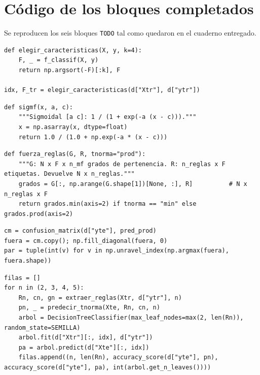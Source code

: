 \documentclass[11pt,letterpaper]{article}
\begin{document}
\clearpage
\appendix
\section{Código de los bloques completados}
\label{anexo:codigo}

Se reproducen los seis bloques \texttt{TODO} tal como quedaron en el cuaderno entregado.

\begin{lstlisting}[caption={TODO 1, cuatro características con el entrenamiento}]
def elegir_caracteristicas(X, y, k=4):
    F, _ = f_classif(X, y)
    return np.argsort(-F)[:k], F

idx, F_tr = elegir_caracteristicas(d["Xtr"], d["ytr"])
\end{lstlisting}

\begin{lstlisting}[caption={TODO 2, función sigmoidal}]
def sigmf(x, a, c):
    """Sigmoidal [a c]: 1 / (1 + exp(-a (x - c)))."""
    x = np.asarray(x, dtype=float)
    return 1.0 / (1.0 + np.exp(-a * (x - c)))
\end{lstlisting}

\begin{lstlisting}[caption={TODO 3, fuerza de las reglas con mínimo o producto}]
def fuerza_reglas(G, R, tnorma="prod"):
    """G: N x F x n_mf grados de pertenencia. R: n_reglas x F etiquetas. Devuelve N x n_reglas."""
    grados = G[:, np.arange(G.shape[1])[None, :], R]          # N x n_reglas x F
    return grados.min(axis=2) if tnorma == "min" else grados.prod(axis=2)
\end{lstlisting}

\begin{lstlisting}[caption={TODO 4, matriz de confusión y par más confundido}]
cm = confusion_matrix(d["yte"], pred_prod)
fuera = cm.copy(); np.fill_diagonal(fuera, 0)
par = tuple(int(v) for v in np.unravel_index(np.argmax(fuera), fuera.shape))
\end{lstlisting}

\begin{lstlisting}[caption={TODO 5, etiquetas, reglas, exactitud y árbol}]
filas = []
for n in (2, 3, 4, 5):
    Rn, cn, gn = extraer_reglas(Xtr, d["ytr"], n)
    pn, _ = predecir_tnorma(Xte, Rn, cn, n)
    arbol = DecisionTreeClassifier(max_leaf_nodes=max(2, len(Rn)), random_state=SEMILLA)
    arbol.fit(d["Xtr"][:, idx], d["ytr"])
    pa = arbol.predict(d["Xte"][:, idx])
    filas.append((n, len(Rn), accuracy_score(d["yte"], pn), accuracy_score(d["yte"], pa), int(arbol.get_n_leaves())))
\end{lstlisting}
\end{document}
